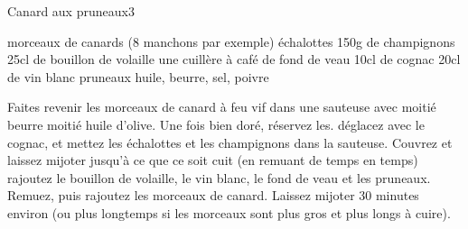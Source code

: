\begin{recette}{Canard aux pruneaux}{3}{}{}
\begin{ingredients}
\ingredient morceaux de canards (8 manchons par exemple)
 échalottes
\ingredient 150g de champignons
\ingredient 25cl de bouillon de volaille
\ingredient une cuillère à café de fond de veau
\ingredient 10cl de cognac
\ingredient 20cl de vin blanc
\ingredient pruneaux
\ingredient huile, beurre, sel, poivre
\end{ingredients}

\begin{preparation}
\etape Faites revenir les morceaux de canard à feu vif dans une sauteuse avec moitié beurre moitié huile d'olive. Une fois bien doré, réservez les.
\etape déglacez avec le cognac, et mettez les échalottes et les champignons dans la sauteuse. Couvrez et laissez mijoter jusqu'à ce que ce soit cuit (en remuant de temps en temps)
\etape rajoutez le bouillon de volaille, le vin blanc, le fond de veau et les pruneaux. Remuez, puis rajoutez les morceaux de canard.
\etape Laissez mijoter 30 minutes environ (ou plus longtemps si les morceaux sont plus gros et plus longs à cuire).
\end{preparation}

\end{recette}

